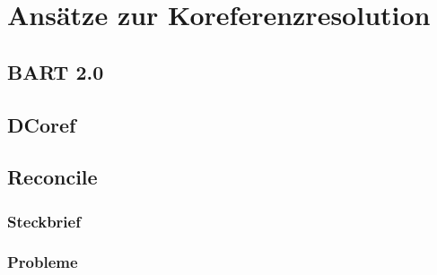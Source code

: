 \documentclass[a4paper,12pt,titlepage=true, ngerman]{scrartcl}
\begin{document}

\newpage

\section{Ansätze zur Koreferenzresolution}\label{Ansätze zur Koreferenzresolution} %



\subsection{BART 2.0}





\subsection{DCoref}





\subsection{Reconcile} %



\subsubsection{Steckbrief} %



\subsubsection{Probleme} %



\newpage
\end{document}
